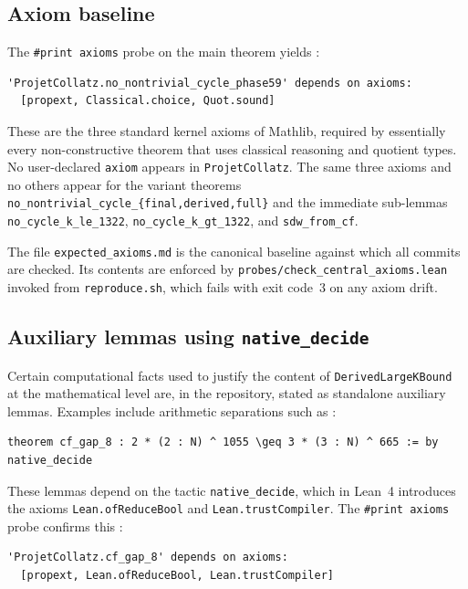 \subsection{Axiom baseline}
\label{sec:axioms}

The \texttt{\#print axioms} probe on the main theorem yields :

\begin{lstlisting}[language={}]
'ProjetCollatz.no_nontrivial_cycle_phase59' depends on axioms:
  [propext, Classical.choice, Quot.sound]
\end{lstlisting}

These are the three standard kernel axioms of Mathlib, required by
essentially every non-constructive theorem that uses classical reasoning
and quotient types. No user-declared \texttt{axiom} appears in
\texttt{ProjetCollatz}. The same three axioms and no others appear for the
variant theorems \texttt{no\_nontrivial\_cycle\_\{final,derived,full\}} and
the immediate sub-lemmas \texttt{no\_cycle\_k\_le\_1322},
\texttt{no\_cycle\_k\_gt\_1322}, and \texttt{sdw\_from\_cf}.

The file \texttt{expected\_axioms.md} is the canonical baseline against which
all commits are checked. Its contents are enforced by
\texttt{probes/check\_central\_axioms.lean} invoked from
\texttt{reproduce.sh}, which fails with exit code~3 on any axiom drift.

\subsection{Auxiliary lemmas using \texttt{native\_decide}}

Certain computational facts used to justify the content of
\texttt{DerivedLargeKBound} at the mathematical level are, in the repository,
stated as standalone auxiliary lemmas. Examples include arithmetic
separations such as :

\begin{lstlisting}[caption={Representative \texttt{native\_decide} lemma (\texttt{Phase59ContinuedFractions.lean}:128).}]
theorem cf_gap_8 : 2 * (2 : N) ^ 1055 \geq 3 * (3 : N) ^ 665 := by native_decide
\end{lstlisting}

These lemmas depend on the tactic \texttt{native\_decide}, which in Lean~4
introduces the axioms \texttt{Lean.ofReduceBool} and
\texttt{Lean.trustCompiler}. The \texttt{\#print axioms} probe confirms
this :

\begin{lstlisting}[language={}]
'ProjetCollatz.cf_gap_8' depends on axioms:
  [propext, Lean.ofReduceBool, Lean.trustCompiler]
\end{lstlisting}

